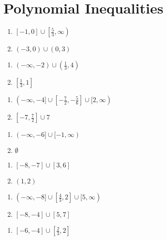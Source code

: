 \section*{Polynomial Inequalities}
\begin{multicols}{2}
\begin{enumerate}
    \item $[-1,0] \cup \left[\frac{5}{3}, \infty\right)$
    \item $(-3,0) \cup (0,3)$
\end{enumerate} \setcounter{Review}{\value{enumi}}
\end{multicols}
\begin{multicols}{2}
\begin{enumerate}	\setcounter{enumi}{\value{Review}}
    \item $(-\infty, -2) \cup \left(\frac{1}{3}, 4\right)$
    \item $\left[\frac{1}{3}, 1\right]$
\end{enumerate} \setcounter{Review}{\value{enumi}}
\end{multicols}
\begin{multicols}{2}
\begin{enumerate}	\setcounter{enumi}{\value{Review}}
    \item $(-\infty, -4] \cup \left[-\frac{7}{2},-\frac{5}{6}\right] \cup [2, \infty)$
    \item $\left[-7, \frac{7}{2}\right] \cup {7}$
\end{enumerate} \setcounter{Review}{\value{enumi}}
\end{multicols}
\begin{multicols}{2}
\begin{enumerate}	\setcounter{enumi}{\value{Review}}
    \item $(-\infty, -6] \cup [-1, \infty)$
    \item $\emptyset$
\end{enumerate} \setcounter{Review}{\value{enumi}}
\end{multicols}
\begin{multicols}{2}
\begin{enumerate}	\setcounter{enumi}{\value{Review}}
    \item $[-8,-7] \cup [3, 6]$
    \item $(1,2)$
\end{enumerate} \setcounter{Review}{\value{enumi}}
\end{multicols}
\begin{multicols}{2}
\begin{enumerate}	\setcounter{enumi}{\value{Review}}
    \item $(-\infty, -8] \cup \left[\frac{4}{3}, 2\right] \cup [5, \infty)$
    \item $[-8, -4] \cup [5, 7]$
\end{enumerate} \setcounter{Review}{\value{enumi}}
\end{multicols}
\begin{multicols}{2}
\begin{enumerate}	\setcounter{enumi}{\value{Review}}
    \item $[-6, -4] \cup \left[\frac{2}{3}, 2\right]$
\end{enumerate}
\end{multicols}

